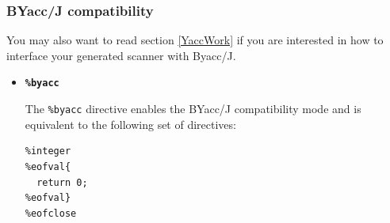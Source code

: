 \documentclass[11pt]{scrartcl}
\begin{document}
\subsubsection{BYacc/J compatibility}\label{YaccMode}
You may also want to read section \ref{YaccWork} 
if you are interested in how to interface your generated
scanner with Byacc/J.
\begin{itemize}
\item
{\bfseries \texttt{\%byacc}}

The \texttt{\%byacc} directive enables the BYacc/J compatibility mode and is equivalent
to the following set of directives:

\begin{verbatim}
%integer
%eofval{
  return 0;
%eofval}
%eofclose
\end{verbatim}

\end{itemize}
\end{document}
